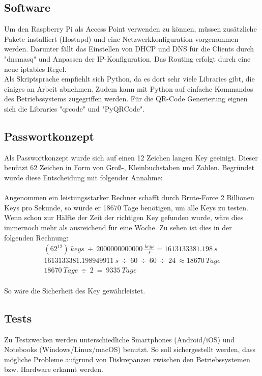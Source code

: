 \documentclass[a4paper,11pt,singlespacing]{article}
\begin{document}
		\subsection{Software}
			Um den Raspberry Pi als Access Point verwenden zu können, müssen zusätzliche Pakete installiert (Hostapd) und eine Netzwerkkonfiguration vorgenommen werden. Darunter fällt das Einstellen von DHCP und DNS für die Clients durch "dnsmasq" und Anpassen der IP-Konfiguration. Das Routing erfolgt durch eine neue iptables Regel.\\ 
		
			Als Skriptsprache empfiehlt sich Python, da es dort sehr viele Libraries gibt, die einiges an Arbeit abnehmen. Zudem kann mit Python auf einfache Kommandos des Betriebssystems zugegriffen werden. Für die QR-Code Generierung eignen sich die Libraries "qrcode" und "PyQRCode". 
		
		\subsection{Passwortkonzept}
			Als Passwortkonzept wurde sich auf einen 12 Zeichen langen Key geeinigt. Dieser benützt 62 Zeichen in Form von Groß-, Kleinbuchstaben und Zahlen. Begründet wurde diese Entscheidung mit folgender Annahme: \\\\
			Angenommen ein leistungsstarker Rechner schafft durch Brute-Force 2 Billionen Keys pro Sekunde, so würde er 18670 Tage benötigen, um alle Keys zu testen.  Wenn schon zur Hälfte der Zeit der richtigen Key gefunden wurde, wäre dies immernoch mehr als ausreichend für eine Woche. Zu sehen ist dies in der folgenden Rechnung:
			\begin{eqnarray}
				(62^{12})\ keys\ \div\ 2000000000000\ \frac{keys}{s} =  1613133381.198\ s\\
				1613133381.198949911\ s\ \div\ 60\ \div\ 60\ \div\ 24\ \approx 18670 \ Tage\\
				18670\ Tage\ \div\ 2\ =\ 9335\ Tage
			\end{eqnarray}\\
		    So wäre die Sicherheit des Key gewährleistet.
	
		\subsection{Tests}
			Zu Testzwecken werden unterschiedliche Smartphones (Android/iOS) und Notebooks (Windows/Linux/macOS) benutzt. So soll sichergestellt werden, dass mögliche Probleme aufgrund von Diskrepanzen zwischen den Betriebssystemen bzw. Hardware erkannt werden.
		
\end{document}
